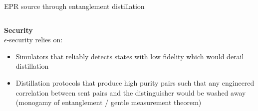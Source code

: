 \documentclass[final]{beamer}
\newlength{\twocolwid}
\begin{document}
\begin{frame}[t]
\begin{columns}[t]
\begin{column}{\twocolwid}
\begin{block}{EPR source through entanglement distillation}
\begin{columns}
    \begin{column}{.60\textwidth}
        \centering
       \textbf{Security}\\[.2cm]
       $\epsilon$-security relies on:
       \begin{itemize}
           \item Simulators that reliably detects states with low fidelity which would derail distillation
          \item Distillation protocols that produce high purity pairs such that any engineered correlation between sent pairs and the distinguisher would be washed away (monogamy of entanglement / gentle measurement theorem)
         \end{itemize} 
    \end{column}%
    
    \hfill%
    
\end{columns}
\end{block}






\end{column}
\end{columns}
\end{frame}
\end{document}

